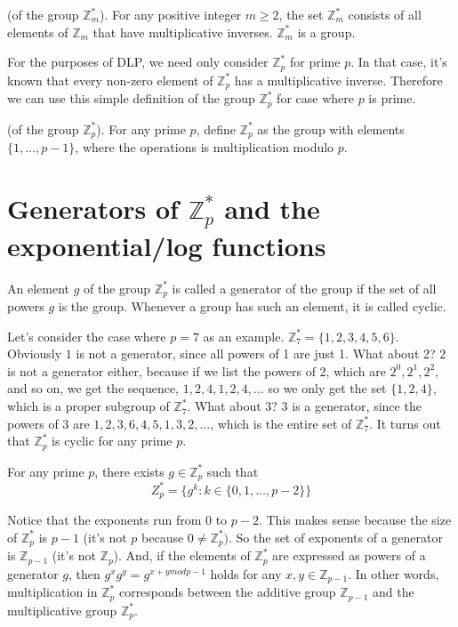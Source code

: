 \begin{definition}
    (of the group $\mathbb{Z}_m^*$). For any positive integer $m\geq 2$, the set $\mathbb{Z}_m^*$ consists of all elements of $\mathbb{Z}_m$ that have multiplicative inverses. $\mathbb{Z}_m^*$ is a group.
\end{definition}
For the purposes of DLP, we need only consider $\mathbb{Z}_p^*$ for prime $p$. In that case, it's known that every non-zero element of $\mathbb{Z}_p^*$ has a multiplicative inverse. Therefore we can use this simple definition of the group $\mathbb{Z}_p^*$ for case where $p$ is prime.

\begin{definition}
    (of the group $\mathbb{Z}_p^*$). For any prime $p$, define $\mathbb{Z}_p^*$ as the group with elements $\{1,\ldots,p-1\}$, where the operations is multiplication modulo $p$.
\end{definition}

\section{Generators of \texorpdfstring{$\mathbb{Z}_p^*$ and the exponential/log functions}{Zp* and exponential/log functions}}
An element $g$ of the group $\mathbb{Z}_p^*$ is called a generator of the group if the set of all powers $g$ is the group. Whenever a group has such an element, it is called cyclic.

Let's consider the case where $p=7$ as an example. $\mathbb{Z}_7^*=\{1,2,3,4,5,6\}$. Obviously $1$ is not a generator, since all powers of 1 are just 1. What about 2? 2 is not a generator either, because if we list the powers of $2$, which are $2^0,2^1,2^2,$ and so on, we get the sequence, $1,2,4,1,2,4,\ldots$ so we only get the set $\{1,2,4\}$, which is a proper subgroup of $\mathbb{Z}_7^*$. What about $3$? $3$ is a generator, since the powers of $3$ are $1,2,3,6,4,5,1,3,2,\ldots$, which is the entire set of $\mathbb{Z}_7^*$. It turns out that $\mathbb{Z}_p^*$ is cyclic for any prime $p$.

\begin{theorem}
    For any prime $p$, there exists $g \in\mathbb{Z}_p^*$ such that
    \[
    Z_p^*=\{g^k:k\in\{0,1,\ldots,p-2\}\}
    \]
\end{theorem}
Notice that the exponents run from $0$ to $p-2$. This makes sense because the size of $\mathbb{Z}_p^*$ is $p-1$ (it's not $p$ because $0\neq \mathbb{Z}_p^*).$ So the set of exponents of a generator is $\mathbb{Z}_{p-1}$ (it's not $\mathbb{Z}_p$). And, if the elements of $\mathbb{Z}_p^*$ are expressed as powers of a generator $g$, then $g^xg^y=g^{x+y mod p-1}$ holds for any $x,y \in\mathbb{Z}_{p-1}$. In other words, multiplication in $\mathbb{Z}_p^*$ corresponds between the additive group $\mathbb{Z}_{p-1}$ and the multiplicative group $\mathbb{Z}_p^*$.

